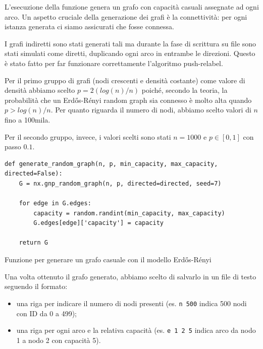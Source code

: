                 L'esecuzione della funzione genera un grafo con capacità casuali assegnate ad ogni arco. Un aspetto cruciale della generazione dei grafi è la connettività: per ogni istanza generata ci siamo assicurati che fosse connessa.

                I grafi indiretti sono stati generati tali ma durante la fase di scrittura su file sono stati simulati come diretti, duplicando ogni arco in entrambe le direzioni. Questo è stato fatto per far funzionare correttamente l'algoritmo push-relabel.
                
                Per il primo gruppo di grafi (nodi crescenti e densità costante) come valore di densità abbiamo scelto $p = 2(log(n)/n)$ poiché, secondo la teoria, la probabilità che un Erdős-Rényi random graph sia connesso è molto alta quando $p > log(n)/n$. Per quanto riguarda il numero di nodi, abbiamo scelto valori di $n$ fino a 100mila.

                Per il secondo gruppo, invece, i valori scelti sono stati $n = 1000$ e $p \in [0,1]$ con passo $0.1$.

                \begin{listing}[ht]
                \begin{verbatim}
def generate_random_graph(n, p, min_capacity, max_capacity, directed=False):
    G = nx.gnp_random_graph(n, p, directed=directed, seed=7)

    for edge in G.edges:
        capacity = random.randint(min_capacity, max_capacity)
        G.edges[edge]['capacity'] = capacity
    
    return G
                \end{verbatim}
                \caption{Funzione per generare un grafo casuale con il modello Erdős-Rényi}\label{code:generate-random-graph}
                \end{listing}

                Una volta ottenuto il grafo generato, abbiamo scelto di salvarlo in un file di testo seguendo il formato:
                \begin{itemize}
                    \item una riga per indicare il numero di nodi presenti (es. \verb|n 500| indica 500 nodi con ID da 0 a 499);
                    \item una riga per ogni arco e la relativa capacità (es. \verb|e 1 2 5| indica arco da nodo 1 a nodo 2 con capacità 5).
                \end{itemize}
            

